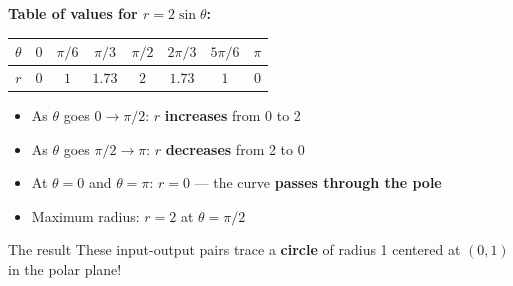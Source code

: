 \documentclass[aspectratio=169, 11pt]{beamer}
\begin{document}
\begin{frame}[t, plain]

  \textbf{Table of values for $r = 2\sin\theta$:}

  \vspace{0.3cm}
  \renewcommand{\arraystretch}{1.4}
  \begin{tabular}{|c|c|c|c|c|c|c|c|}
  \hline
  $\theta$ & $0$ & $\pi/6$ & $\pi/3$ & $\pi/2$ & $2\pi/3$ & $5\pi/6$ & $\pi$ \\
  \hline
  $r$ & $0$ & $1$ & $1.73$ & $2$ & $1.73$ & $1$ & $0$ \\
  \hline
  \end{tabular}

  \vspace{0.4cm}
  \begin{itemize}
    \item As $\theta$ goes $0 \to \pi/2$: $r$ \textbf{increases} from 0 to 2
    \item As $\theta$ goes $\pi/2 \to \pi$: $r$ \textbf{decreases} from 2 to 0
    \item At $\theta = 0$ and $\theta = \pi$: $r = 0$ --- the curve \textbf{passes through the pole}
    \item Maximum radius: $r = 2$ at $\theta = \pi/2$
  \end{itemize}

  \vspace{0.3cm}
  \begin{block}{The result}
    These input-output pairs trace a \textbf{circle} of radius 1 centered at $(0, 1)$ in
    the polar plane!
  \end{block}
\end{frame}
\end{document}
